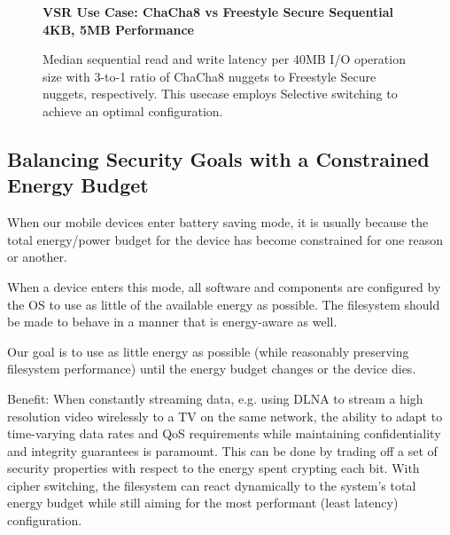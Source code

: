 \begin{figure}[ht] \textbf{VSR Use Case: ChaCha8 vs Freestyle Secure Sequential
4KB, 5MB Performance}\par\medskip
   \centering
   {} \caption{Median sequential read and
   write latency per 40MB I/O operation size with 3-to-1 ratio of ChaCha8
   nuggets to Freestyle Secure nuggets, respectively. This usecase employs
   Selective switching to achieve an optimal configuration.}
  \label{fig:usecase-vsr-bar}
\end{figure}


\subsection{Balancing Security Goals with a Constrained Energy Budget}

When our mobile devices enter battery saving mode, it is usually because the
total energy/power budget for the device has become constrained for one reason
or another.

When a device enters this mode, all software and components are configured by
the OS to use as little of the available energy as possible. The filesystem
should be made to behave in a manner that is energy-aware as well.

Our goal is to use as little energy as possible (while reasonably preserving
filesystem performance) until the energy budget changes or the device dies.

Benefit: When constantly streaming data, e.g. using DLNA to stream a high
resolution video wirelessly to a TV on the same network, the ability to adapt to
time-varying data rates and QoS requirements while maintaining confidentiality
and integrity guarantees is paramount. This can be done by trading off a set of
security properties with respect to the energy spent crypting each bit. With
cipher switching, the filesystem can react dynamically to the system's total
energy budget while still aiming for the most performant (least latency)
configuration.

